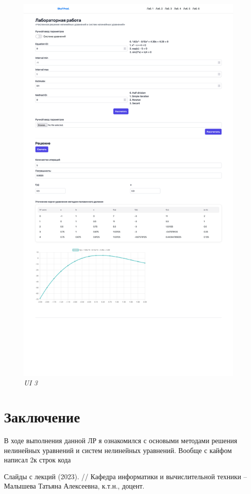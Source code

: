 \documentclass{article}
\begin{document}
            \begin{figure}[H] 
                  \begin{center}  
                        \includegraphics[scale=0.1]{SS3.png}
                        \caption{\small \sl UI 3}  
                  \end{center}  
            \end{figure}
      
\section{Заключение}
      В ходе выполнения данной ЛР я ознакомился с основыми методами решения нелинейных уравнений и систем нелинейных уравнений. Вообще с кайфом написал 2к строк кода

\begin{thebibliography}{9}
    Слайды с лекций (2023). // Кафедра информатики и вычислительной техники -- Малышева Татьяна Алексеевна, к.т.н., доцент.
\end{thebibliography} 
\end{document}
